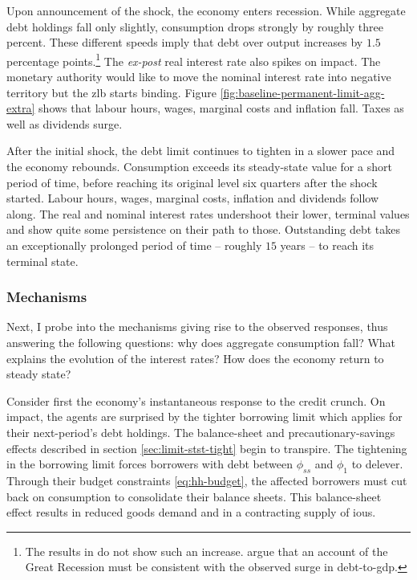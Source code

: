 \documentclass[a4paper,12pt]{article} %
\numberwithin{equation}{section} %
\numberwithin{figure}{section}
\numberwithin{table}{section}
\begin{document}
Upon announcement of the shock, the economy enters recession. While aggregate debt holdings fall only slightly, consumption drops strongly by roughly three percent. These different speeds imply that debt over output increases by $1.5$ percentage points.\footnote{The results in \textcite{gl2017} do not show such an increase. \textcite{justiniano2015} argue that an account of the Great Recession must be consistent with the observed surge in debt-to-\Gls{gdp}.} The \textit{ex-post} real interest rate also spikes on impact. The monetary authority would like to move the nominal interest rate into negative territory but the \Gls{zlb} starts binding. Figure \ref{fig:baseline-permanent-limit-agg-extra} shows that labour hours, wages, marginal costs and inflation fall. Taxes as well as dividends surge.

After the initial shock, the debt limit continues to tighten in a slower pace and the economy rebounds. Consumption exceeds its steady-state value for a short period of time, before reaching its original level six quarters after the shock started. Labour hours, wages, marginal costs, inflation and dividends follow along. The real and nominal interest rates undershoot their lower, terminal values and show quite some persistence on their path to those. Outstanding debt takes an exceptionally prolonged period of time -- roughly $15$ years -- to reach its terminal state. 

\subsubsection{Mechanisms}
\label{sec:limit-transition-mechanisms}

Next, I probe into the mechanisms giving rise to the observed responses, thus answering the following questions: why does aggregate consumption fall? What explains the evolution of the interest rates? How does the economy return to steady state?

Consider first the economy's instantaneous response to the credit crunch. On impact, the agents are surprised by the tighter borrowing limit which applies for their next-period's debt holdings. The balance-sheet and precautionary-savings effects described in section \ref{sec:limit-stst-tight} begin to transpire. The tightening in the borrowing limit forces borrowers with debt between $\phi_{ss}$ and $\phi_1$ to delever. Through their budget constraints \eqref{eq:hh-budget}, the affected borrowers must cut back on consumption to consolidate their balance sheets. This balance-sheet effect results in reduced goods demand and in a contracting supply of \Gls{iou}s.
\end{document}

